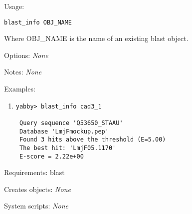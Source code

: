 \begin{description}


\item{Usage:}

{\tt blast\_info OBJ\_NAME}

Where OBJ\_NAME is the name of an existing blast object.



\item{Options:} {\em None}


\item{Notes:} {\em None}


\item{Examples:}
\begin{enumerate}

\item
\begin{verbatim}
yabby> blast_info cad3_1

 Query sequence 'Q53650_STAAU'
 Database 'LmjFmockup.pep'
 Found 3 hits above the threshold (E=5.00)
 The best hit: 'LmjF05.1170'
 E-score = 2.22e+00

\end{verbatim}

\end{enumerate}


\item{Requirements:} blast


\item{Creates objects:} {\em None}


\item{System scripts:} {\em None}

\end{description}



\subsection[blastg]{  }


